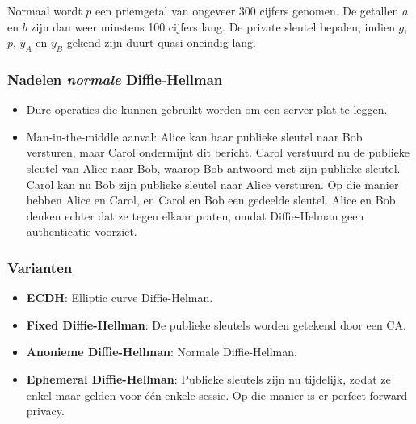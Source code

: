 \documentclass{report}
\begin{document}
	 Normaal wordt $p$ een priemgetal van ongeveer 300 cijfers genomen. De getallen $a$ en $b$ zijn dan weer minstens 100 cijfers lang. De private sleutel bepalen, indien $g$, $p$, $y_A$ en $y_B$ gekend zijn duurt quasi oneindig lang. 

	\subsubsection{Nadelen \emph{normale} Diffie-Hellman}
	\begin{itemize}
		\item[\alert] Dure operaties die kunnen gebruikt worden om een server plat te leggen.
		\item[\alert] Man-in-the-middle aanval: Alice kan haar publieke sleutel naar Bob versturen, maar Carol ondermijnt dit bericht. Carol verstuurd nu de publieke sleutel van Alice naar Bob, waarop Bob antwoord met zijn publieke sleutel. Carol kan nu Bob zijn publieke sleutel naar Alice versturen. Op die manier hebben Alice en Carol, en Carol en Bob een gedeelde sleutel. Alice en Bob denken echter dat ze tegen elkaar praten, omdat Diffie-Helman geen authenticatie voorziet.
	\end{itemize}
	\subsubsection{Varianten}
	\begin{itemize}
		\item[\info] \textbf{ECDH}: Elliptic curve Diffie-Helman.
		\item[\info] \textbf{Fixed Diffie-Hellman}: De publieke sleutels worden getekend door een CA.
		\item[\info] \textbf{Anonieme Diffie-Hellman}: Normale Diffie-Hellman.
		\item[\info] \textbf{Ephemeral Diffie-Hellman}: Publieke sleutels zijn nu tijdelijk, zodat ze enkel maar gelden voor één enkele sessie. Op die manier is er perfect forward privacy. 
	\end{itemize}
\end{document}
